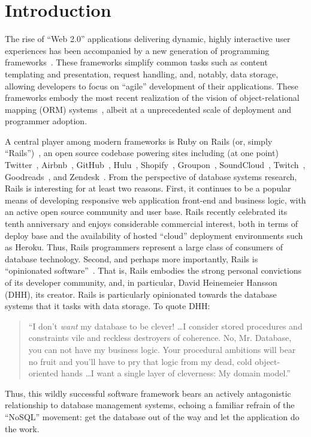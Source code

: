 
\section{Introduction}
\label{sec:intro}

The rise of ``Web 2.0'' applications delivering dynamic, highly
interactive user experiences has been accompanied by a new generation
of programming frameworks~\cite{web20}. These frameworks simplify
common tasks such as content templating and presentation, request
handling, and, notably, data storage, allowing developers to focus on
``agile'' development of their applications. These frameworks embody
the most recent realization of the vision of object-relational mapping
(ORM) systems~\cite{orm-db}, albeit at a unprecedented scale of deployment and
programmer adoption.

A central player among modern frameworks is Ruby on Rails (or, simply
``Rails'')~\cite{rails-book,rails-computer}, an open source codebase
powering sites including (at one point) Twitter~\cite{twitter-rails},
Airbnb~\cite{airbnb-rails}, GitHub~\cite{github-rails},
Hulu~\cite{hulu-rails}, Shopify~\cite{shopify-rails},
Groupon~\cite{groupon-rails}, SoundCloud~\cite{soundcloud-rails},
Twitch~\cite{twitch-rails}, Goodreads~\cite{goodreads-rails}, and
Zendesk~\cite{zendesk-rails}. From the perspective of database systems
research, Rails is interesting for at least two reasons. First, it
continues to be a popular means of developing responsive web
application front-end and business logic, with an active open source
community and user base. Rails recently celebrated its tenth
anniversary and enjoys considerable commercial interest, both in terms
of deploy base and the availability of hosted ``cloud'' deployment
environments such as Heroku. Thus, Rails programmers represent a large
class of consumers of database technology. Second, and perhaps more
importantly, Rails is ``opinionated
software''~\cite{dhh-opinionated}. That is, Rails embodies the strong
personal convictions of its developer community, and, in particular,
David Heinemeier Hansson (DHH), its creator. Rails is particularly
opinionated towards the database systems that it tasks with data
storage. To quote DHH:
\begin{quote}
``I don't \textit{want} my database to be clever! \dots I consider stored procedures and constraints vile and reckless destroyers of coherence. No, Mr. Database, you can not have my business logic. Your procedural ambitions will bear no fruit and you'll have to pry that logic from my dead, cold object-oriented hands \dots I want a single layer of cleverness: My domain model.''~\cite{dhh-clever}
\end{quote}
Thus, this wildly successful software framework bears an actively
antagonistic relationship to database management systems, echoing a familiar refrain of the ``NoSQL'' movement: get the database out of the way and let the application do the work.


